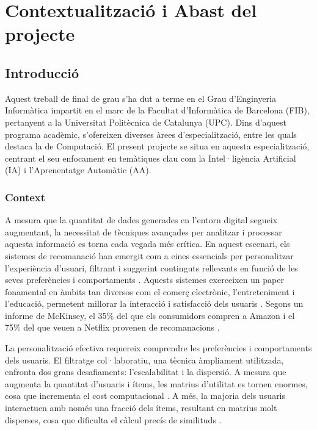 \documentclass[a4paper,12pt]{report}
\begin{document}

\tableofcontents

\listoffigures

\listoftables

\chapter{Contextualització i Abast del projecte}

\section{Introducció}

Aquest treball de final de grau s'ha dut a terme en el Grau d'Enginyeria Informàtica impartit en el marc de la Facultat d'Informàtica de Barcelona (FIB), pertanyent a la Universitat Politècnica de Catalunya (UPC). Dins d'aquest programa acadèmic, s'ofereixen diverses àrees d'especialització, entre les quals destaca la de Computació. El present projecte se situa en aquesta especialització, centrant el seu enfocament en temàtiques clau com la Intel·ligència Artificial (IA) i l'Aprenentatge Automàtic (AA).

\subsection{Context}

A mesura que la quantitat de dades generades en l'entorn digital segueix augmentant, la necessitat de tècniques avançades per analitzar i processar aquesta informació es torna cada vegada més crítica.
En aquest escenari, els sistemes de recomanació han emergit com a eines essencials per personalitzar l'experiència d'usuari, filtrant i suggerint continguts rellevants en funció de les seves preferències i comportaments \cite{Idrees_2024}.
Aquests sistemes exerceixen un paper fonamental en àmbits tan diversos com el comerç electrònic, l'entreteniment i l'educació, permetent millorar la interacció i satisfacció dels usuaris \cite{Kantor_Ricci_Rokach_Shapira_2011}.
Segons un informe de McKinsey, el 35\% del que els consumidors compren a Amazon i el 75\% del que veuen a Netflix provenen de recomanacions \cite{MacKenzie_Meyer_Noble_2013}.

La personalització efectiva requereix comprendre les preferències i comportaments dels usuaris.
El filtratge col·laboratiu, una tècnica àmpliament utilitzada, enfronta dos grans desafiaments: l'escalabilitat i la dispersió.
A mesura que augmenta la quantitat d'usuaris i ítems, les matrius d'utilitat es tornen enormes, cosa que incrementa el cost computacional \cite{sarwar2001item}.
A més, la majoria dels usuaris interactuen amb només una fracció dels ítems, resultant en matrius molt disperses, cosa que dificulta el càlcul precís de similituds \cite{adomavicius2005toward}.
\end{document}
